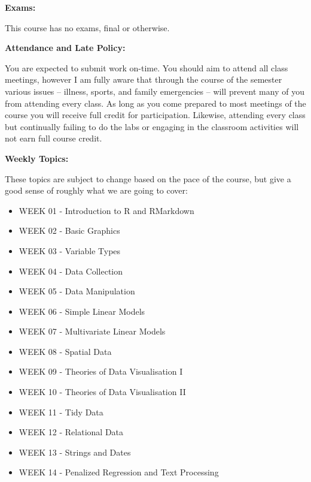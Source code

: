 \documentclass[12pt]{article}
\begin{document}
\textbf{Exams:} \vspace{6pt}

This course has no exams, final or otherwise.

\vspace{0.4cm}

\textbf{Attendance and Late Policy:} \vspace{6pt}

You are expected to submit work on-time.
You should aim to attend all class meetings, however I am fully aware that through
the course of the semester various issues -- illness, sports, and family emergencies --
will prevent many of you from attending every class. As long as you come
prepared to most meetings of the course you will receive full credit for participation.
Likewise, attending every class but continually failing to do the labs or engaging in
the classroom activities will not earn full course credit.

\vspace{0.5cm}

\textbf{Weekly Topics:} \vspace{6pt}

These topics are subject to change based on the pace of the course, but
give a good sense of roughly what we are going to cover:

\vspace{0.5cm}

\def\labelitemi{}
\def\labelitemii{}

\begin{itemize}\setlength\itemsep{0em}
\item WEEK 01 - Introduction to R and RMarkdown
\item WEEK 02 - Basic Graphics
\item WEEK 03 - Variable Types
\item WEEK 04 - Data Collection
\item WEEK 05 - Data Manipulation
\item WEEK 06 - Simple Linear Models
\item WEEK 07 - Multivariate Linear Models
\item WEEK 08 - Spatial Data
\item WEEK 09 - Theories of Data Visualisation I
\item WEEK 10 - Theories of Data Visualisation II
\item WEEK 11 - Tidy Data
\item WEEK 12 - Relational Data
\item WEEK 13 - Strings and Dates
\item WEEK 14 - Penalized Regression and Text Processing
\end{itemize}
\end{document}
